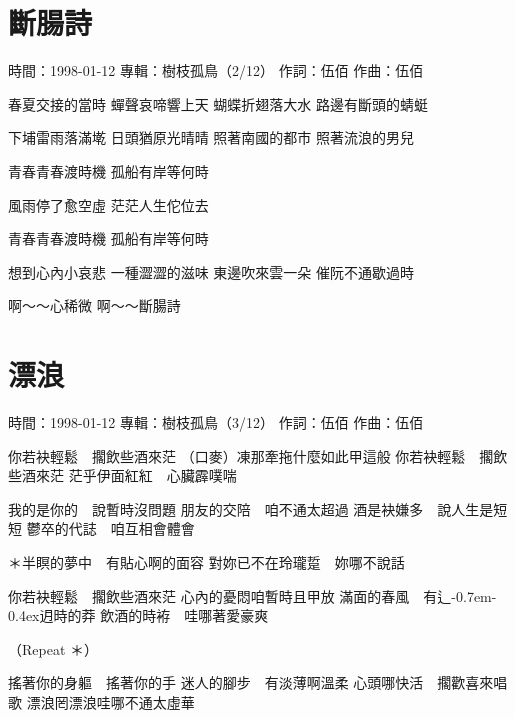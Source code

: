 \documentclass[UTF8,a4paper,oneside,twocolumn,12pt]{ctexbook}
\newcommand{\infopair}[2]{\textbullet #1：#2}
\newcommand{\zc}[1][伍佰]{\infopair{作詞}{#1}}
\newcommand{\zq}[1][伍佰]{\infopair{作曲}{#1}}
\newcommand{\zj}[1]{\infopair{專輯}{#1}}
\newcommand{\sj}[1]{\infopair{時間}{#1}}
\newcommand{\tshittho}{\hbox{辶\kern-0.7em\lower-0.4ex\hbox{\scalebox{0.7}{日}}}迌}
\newenvironment{info}{\begin{flushleft}\kaishu
	}
	{\end{flushleft}\normalsize\yahei\par}
\newenvironment{lyric}{
	}
{}
\begin{document}
\section{斷腸詩}
\begin{info}
	\sj{1998-01-12}
	\zj{樹枝孤鳥（2/12）}
	\zc
	\zq
\end{info}
\begin{lyric}
	春夏交接的當時
	蟬聲哀啼響上天
	蝴蝶折翅落大水
	路邊有斷頭的蜻蜓

	下埔雷雨落滿墘
	日頭猶原光晴晴
	照著南國的都市
	照著流浪的男兒

	青春青春渡時機
	孤船有岸等何時

	風雨停了愈空虛
	茫茫人生佗位去

	青春青春渡時機
	孤船有岸等何時

	想到心內小哀悲
	一種澀澀的滋味
	東邊吹來雲一朵
	催阮不通歇過時

	啊～～心稀微
	啊～～斷腸詩
\end{lyric}

\section{漂浪}
\begin{info}
	\sj{1998-01-12}
	\zj{樹枝孤鳥（3/12）}
	\zc
	\zq
\end{info}
\begin{lyric}
	你若袂輕鬆　擱飲些酒來茫
	（口麥）凍那牽拖什麼如此甲這般
	你若袂輕鬆　擱飲些酒來茫
	茫乎伊面紅紅　心臟霹噗喘

	我的是你的　說暫時沒問題
	朋友的交陪　咱不通太超過
	酒是袂嫌多　說人生是短短
	鬱卒的代誌　咱互相會體會

	＊半瞑的夢中　有貼心啊的面容
	對妳已不在玲瓏踅　妳哪不說話

	你若袂輕鬆　擱飲些酒來茫
	心內的憂悶咱暫時且甲放
	滿面的春風　有\tshittho{}時的莽
	飲酒的時袸　哇哪著愛豪爽

	（Repeat ＊）

	搖著你的身軀　搖著你的手
	迷人的腳步　有淡薄啊溫柔
	心頭哪快活　擱歡喜來唱歌
	漂浪罔漂浪哇哪不通太虛華
\end{lyric}
\end{document}
